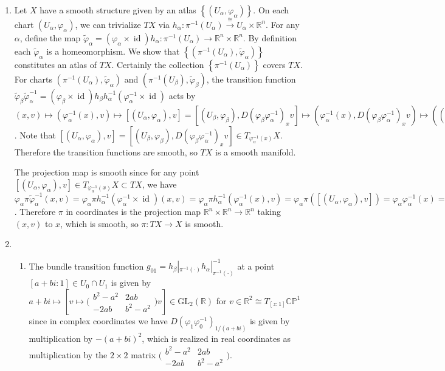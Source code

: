 \documentclass[11pt,leqno]{article}
\theoremstyle{plain}
\theoremstyle{definition}
\numberwithin{equation}{section}
\numberwithin{lem}{section}
\newcommand{\cbr}[1]{\left\{#1\right\}}
\DeclareMathOperator{\id}{id}
\newcommand{\GL}{\mathrm{GL}}
\begin{document}
\begin{enumerate}
    \item Let $X$ have a smooth structure given by an atlas $\cbr{(U_\alpha,\varphi_\alpha)}$. On each chart $(U_\alpha,\varphi_\alpha)$, we can trivialize $TX$ via $h_\alpha\colon \pi^{-1}(U_\alpha)\xrightarrow{\cong} U_\alpha\times \mathbb R^n$. For any $\alpha$, define the map $\tilde\varphi_\alpha = (\varphi_\alpha\times \id)h_\alpha \colon \pi^{-1}(U_\alpha) \to \mathbb R^n\times \mathbb R^n$. By definition each $\tilde\varphi_\alpha$ is a homeomorphism. We show that $\cbr{(\pi^{-1}(U_\alpha), \tilde\varphi_\alpha)}$ constitutes an atlas of $TX$. Certainly the collection $\cbr{\pi^{-1}(U_\alpha)}$ covers $TX$. For charts $(\pi^{-1}(U_\alpha), \tilde\varphi_\alpha)$ and $(\pi^{-1}(U_\beta), \tilde\varphi_\beta)$, the transition function $\tilde\varphi_\beta\tilde\varphi_\alpha^{-1} = (\varphi_\beta\times \id)h_\beta h_\alpha^{-1}(\varphi_\alpha^{-1}\times\id)$ acts by $(x,v)\mapsto (\varphi_\alpha^{-1}(x),v)\mapsto [(U_\alpha,\varphi_\alpha),v] = [(U_\beta,\varphi_\beta),D(\varphi_\beta\varphi_\alpha^{-1})_{x}v]\mapsto (\varphi_\alpha^{-1}(x),D(\varphi_\beta\varphi_\alpha^{-1})_{x}v)\mapsto ((\varphi_\beta\varphi_\alpha^{-1})(x),D(\varphi_\beta\varphi_\alpha^{-1})_{x}v)$. Note that $[(U_\alpha,\varphi_\alpha),v] = [(U_\beta,\varphi_\beta),D(\varphi_\beta\varphi_\alpha^{-1})_{x}v]\in T_{\varphi_\alpha^{-1}(x)}X$. Therefore the transition functions are smooth, so $TX$ is a smooth manifold.
    
    The projection map is smooth since for any point $[(U_\alpha,\varphi_\alpha),v]\in T_{\varphi_\alpha^{-1}(x)}X\subset TX$, we have $\varphi_\alpha \pi \tilde\varphi_\alpha^{-1}(x,v) = \varphi_\alpha\pi h_\alpha^{-1}(\varphi_\alpha^{-1}\times \id)(x,v) = \varphi_\alpha\pi h_\alpha^{-1}(\varphi_\alpha^{-1}(x),v) = \varphi_\alpha\pi([(U_\alpha,\varphi_\alpha),v]) = \varphi_\alpha\varphi_\alpha^{-1}(x) = x$. Therefore $\pi$ in coordinates is the projection map $\mathbb R^n\times \mathbb R^n\to \mathbb R^n$ taking $(x,v)$ to $x$, which is smooth, so $\pi\colon TX\to X$ is smooth.
    \item \begin{enumerate}
        \item The bundle transition function $g_{01} = h_\beta|_{\pi^{-1}(\cdot)}h_\alpha|_{\pi^{-1}(\cdot)}^{-1}$ at a point $[a+bi:1]\in U_0\cap U_1$ is given by $a+bi\mapsto [v\mapsto \big(\!\begin{smallmatrix}
            b^2-a^2 & 2ab \\ -2ab & b^2-a^2
        \end{smallmatrix}\!\big)v]\in \GL_2(\mathbb R)$ for $v\in \mathbb R^2 \cong T_{[z:1]}\mathbb{CP}^1$ since in complex coordinates we have $D(\varphi_1\varphi_0^{-1})_{1/(a+bi)}$ is given by multiplication by $ -(a+bi)^2$, which is realized in real coordinates as multiplication by the $2\times 2$ matrix $\big(\!\begin{smallmatrix}
            b^2-a^2 & 2ab \\ -2ab & b^2-a^2
        \end{smallmatrix}\!\big)$. 
        

\end{enumerate}
\end{enumerate}
\end{document}
